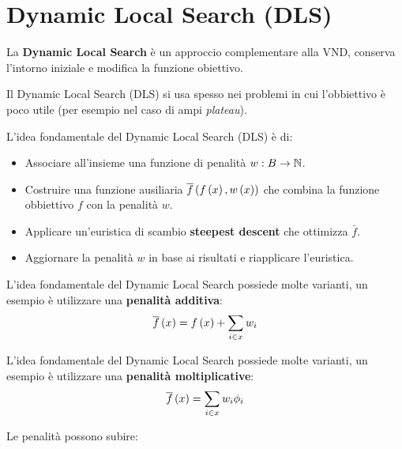\documentclass[\main/main.tex]{subfiles}
\begin{document}
\section{Dynamic Local Search (DLS)}
\begin{multicols}{2}
\begin{observation}
    La \textbf{Dynamic Local Search} è un approccio complementare alla VND, conserva l'intorno iniziale e modifica la funzione obiettivo.
\end{observation}
\begin{observation}
    Il Dynamic Local Search (DLS) si usa spesso nei problemi in cui l'obbiettivo è poco utile (per esempio nel caso di ampi \textit{plateau}).
\end{observation}
\begin{observation}
    L'idea fondamentale del Dynamic Local Search (DLS) è di:
    \begin{itemize}
        \item Associare all'insieme una funzione di penalità \(w: B \rightarrow \mathbb{N}\).
        \item Costruire una funzione ausiliaria \(\overline{f}\left(f\left(x\right), w\left(x\right)\right)\) che combina la funzione obbiettivo \(f\) con la penalità \(w\).
        \item Applicare un'euristica di scambio \textbf{steepest descent} che ottimizza \(\bar{f}\).
        \item Aggiornare la penalità \(w\) in base ai risultati e riapplicare l'euristica.
    \end{itemize}
\end{observation}
\begin{definition}
    L'idea fondamentale del Dynamic Local Search possiede molte varianti, un esempio è utilizzare una \textbf{penalità additiva}:
     \[
        \overline{f}\left(x\right) = f\left(x\right) + \sum_{i \in x} w_i
    \]
\end{definition}
\begin{definition}
    L'idea fondamentale del Dynamic Local Search possiede molte varianti, un esempio è utilizzare una \textbf{penalità moltiplicative}:
     \[
       \overline{f}\left(x\right) = \sum_{i \in x} w_i \phi_i
    \]
\end{definition}
\begin{observation}
    Le penalità possono subire:

\end{observation}
\end{multicols}
\end{document}
